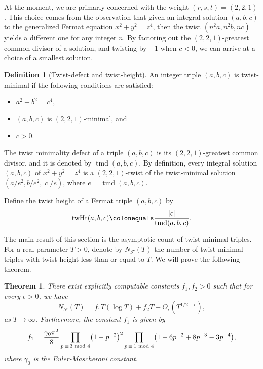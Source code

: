 \documentclass[12pt]{amsart}
\newcounter{counter}[section] %
\numberwithin{equation}{section} %
\newtheorem{theorem}[counter]{Theorem}
\theoremstyle{definition} \newtheorem{definition}[counter]{Definition}
\theoremstyle{remark} \newtheorem{nonexam}[counter]{Non-example}
\newcommand{\FF}{\mathscr{F}} %
\newcommand{\md}{\text{ mod }} %
\newcommand{\paren}[1]{\left( #1 \right)} %
\newcommand{\cdef}[1]{\textsf{#1}} %
\let\originalleft\left \let\originalright\right
\renewcommand{\left}{\mathopen{}\mathclose\bgroup\originalleft}
\renewcommand{\right}{\aftergroup\egroup\originalright}
\DeclareMathOperator{\twmind}{tmd} %
\DeclareMathOperator{\twht}{twHt} %
\begin{document}
At the moment, we are primarly concerned with the weight $(r,s,t) = (2,2,1)$.
This choice comes from the observation that given an integral solution
$(a,b,c)$ to the generalized Fermat equation $x^2 + y^2 = z^4$, then the twist
$(n^2a,n^2b,nc)$ yields a different one for any integer $n$. By factoring out
the $(2,2,1)$-greatest common divisor of a solution, and twisting by $-1$ when
$c <0$, we can arrive at a choice of a smallest solution.

\begin{definition}[Twist-defect and twist-height]
  An integer triple $(a,b,c)$ is
  \cdef{twist-minimal} if the following conditions are satisfied:
  \begin{itemize}
   \item $a^2 + b^2 = c^4$,
   \item $(a,b,c)$ is $(2,2,1)$-minimal, and
   \item $c>0$.
   \end{itemize}
     The \cdef{twist minimality defect} of a triple $(a,b,c)$ is its
  $(2,2,1)$-greatest common divisor, and it is denoted by $\twmind(a,b,c)$. By
  definition, every integral solution $(a,b,c)$ of $x^2 + y^2 = z^4$ is a
  $(2,2,1)$-twist of the twist-minimal solution $(a/e^2, b/e^2, |c|/e)$, where
  $e = \twmind(a,b,c)$.

  Define the \cdef{twist height} of a Fermat triple $(a,b,c)$ by
  \begin{equation}
    \label{eq:twist-height}
    \twht(a,b,c) \colonequals \dfrac{|c|}{\twmind(a,b,c)}.
  \end{equation}
\end{definition}

The main result of this section is the asymptotic count of twist minimal
triples. For a real parameter $T > 0$, denote by $N_\FF(T)$ the number of twist
minimal triples with twist height less than or equal to $T$. We will prove the
following theorem.

\begin{theorem}
    \label{thm:FF-count}
    There exist explicitly computable constants $f_1, f_2 > 0$ such that for
    every $\epsilon > 0$, we have
    $$N_{\FF}(T) = f_1 T(\log T) + f_2T + O_\epsilon(T^{1/2+\epsilon}),$$
    as $T \to \infty$. Furthermore, the constant $f_1$ is given by 
    \begin{equation*}
      f_1 = \dfrac{\gamma_0\pi^2}{8}\prod_{p \, \equiv\, 3 \md 4}\paren{1-p^{-2}}^2
      \prod_{p \, \equiv\, 1 \md 4}\paren{1 -6p^{-2}+8p^{-3}-3p^{-4}},
      \end{equation*}
      where $\gamma_0$ is the Euler-Mascheroni constant.
\end{theorem}
\end{document}
